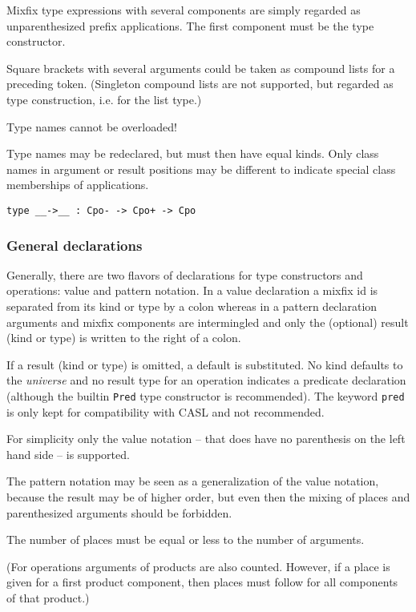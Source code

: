 \documentclass{article}
\begin{document}
Mixfix type expressions with several components are simply regarded as
unparenthesized prefix applications. The first component must be the
type constructor.

Square brackets with several arguments could be taken as compound lists for a
preceding token. (Singleton compound lists are not supported, but regarded as
type construction, i.e. for the list type.)

Type names cannot be overloaded! 

Type names may be redeclared, but must then have equal kinds. Only
class names in argument or result positions may be different to indicate
special class memberships of applications.

\begin{verbatim}
type __->__ : Cpo- -> Cpo+ -> Cpo
\end{verbatim}

\subsubsection*{General declarations}

Generally, there are two flavors of declarations for type constructors and
operations: value and pattern notation. In a value declaration a mixfix id is
separated from its kind or type by a colon whereas in a pattern declaration
arguments and mixfix components are intermingled and only the (optional)
result (kind or type) is written to the right of a colon. 

If a result (kind or type) is omitted, a default is substituted. No kind
defaults to the \emph{universe} and no result type for an operation indicates
a predicate declaration (although the builtin \texttt{Pred} type constructor
is recommended). The keyword \texttt{pred} is only kept for compatibility with
CASL and not recommended.

For simplicity only the value notation -- that does have no parenthesis on the
left hand side -- is supported. 

The pattern notation may be seen as a generalization of the value notation,
because the result may be of higher order, but even then the mixing of places
and parenthesized arguments should be forbidden.

The number of places must be equal or less to the number of arguments.

(For operations arguments of products are also counted. However, if a place is
given for a first product component, then places must follow for all
components of that product.)
\end{document}
